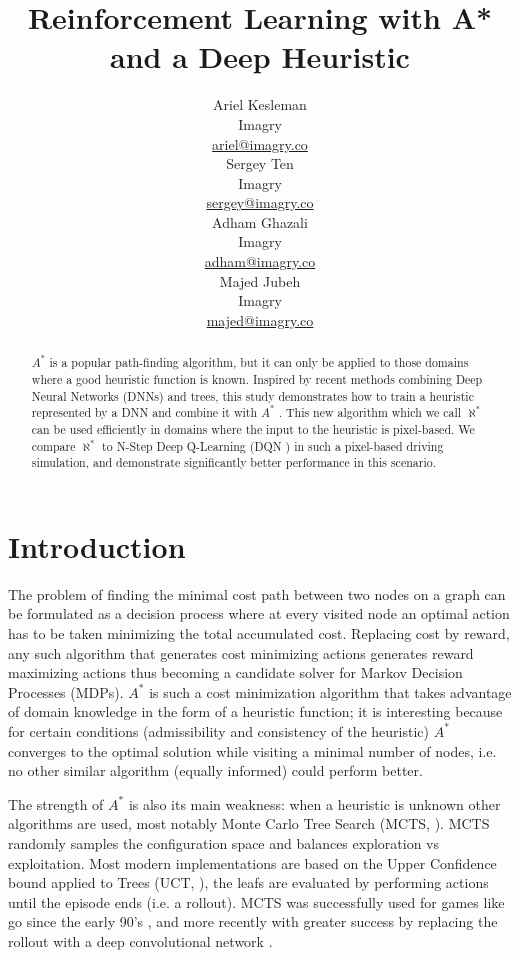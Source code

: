 \documentclass{article}
\title{Reinforcement Learning with A* and a Deep Heuristic}
\author{
  Ariel Kesleman\\
  Imagry\\
  \href{mailto:ariel@imagry.co}{ariel@imagry.co}\\
  \And
  Sergey Ten\\
  Imagry\\
  \href{mailto:}{sergey@imagry.co}\\
  \And
  Adham Ghazali\\
  Imagry\\
  \href{mailto:adham@imagry.co}{adham@imagry.co}\\
  \And
  Majed Jubeh\\
  Imagry\\
  \href{mailto:majed@imagry.co}{majed@imagry.co}\\
}
\newcommand{\alephstar}{$\aleph^*$ }
\newcommand{\astar}{$A^*$ }
\begin{document}
\maketitle


\begin{abstract}
\astar is a popular path-finding algorithm, but it can only be  applied to those domains where a good heuristic function is known. Inspired by recent methods combining Deep Neural Networks (DNNs) and trees, this study demonstrates how to train a heuristic represented by a DNN and combine it with \astar. This new algorithm which we call \alephstar can be used efficiently in domains where the input to the heuristic is pixel-based. We compare \alephstar to N-Step Deep Q-Learning (DQN \citealt{mnih2013playing}) in such a pixel-based driving simulation, and demonstrate significantly better performance in this scenario.
\end{abstract} 



\section{Introduction}
\label{sec:introduction}

The problem of finding the minimal cost path between two nodes on a graph can be formulated as a decision process where at every visited node an optimal action has to be taken minimizing the total accumulated cost. Replacing cost by reward, any such algorithm that generates cost minimizing actions generates reward maximizing actions thus becoming a candidate solver for Markov Decision Processes (MDPs). \astar \citep{hart68} is such a cost minimization algorithm that takes advantage of domain knowledge in the form of a heuristic function; it is interesting because for certain conditions (admissibility and consistency of the heuristic) \astar converges to the optimal solution while visiting a minimal number of nodes, i.e. no other similar algorithm (equally informed) could perform better. 

The strength of \astar is also its main weakness: when a heuristic is unknown other algorithms are used, most notably Monte Carlo Tree Search (MCTS, \citealt{abramson1987}). MCTS randomly samples the configuration space and balances exploration vs exploitation. Most modern implementations are based on the Upper Confidence bound applied to Trees (UCT, \citealt{kocsis2006}), the leafs are evaluated by performing actions until the episode ends (i.e. a rollout). MCTS was successfully used for games like go since the early 90's \citep{brugmann1993, gelly2006}, and more recently with greater success by replacing the rollout with a deep convolutional network \citep{silver2016, anthony2017, silver2017, silver2017mastering}.
\end{document}
